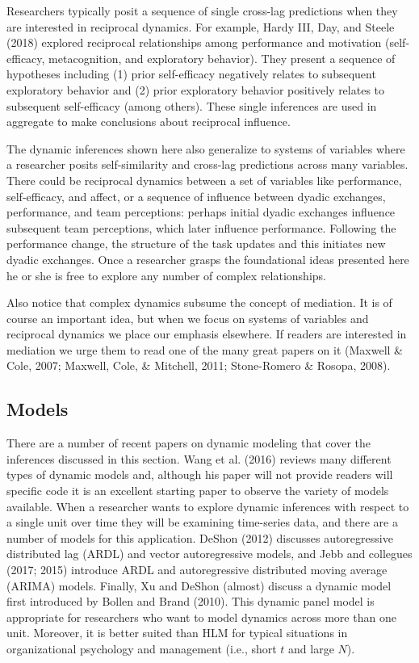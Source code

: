 \documentclass[english,,man]{apa6}
\theoremstyle{definition}
\theoremstyle{definition}
\theoremstyle{definition}
\theoremstyle{remark}
\begin{document}
Researchers typically posit a sequence of single cross-lag predictions
when they are interested in reciprocal dynamics. For example, Hardy III,
Day, and Steele (2018) explored reciprocal relationships among
performance and motivation (self-efficacy, metacognition, and
exploratory behavior). They present a sequence of hypotheses including
(1) prior self-efficacy negatively relates to subsequent exploratory
behavior and (2) prior exploratory behavior positively relates to
subsequent self-efficacy (among others). These single inferences are
used in aggregate to make conclusions about reciprocal influence.

The dynamic inferences shown here also generalize to systems of
variables where a researcher posits self-similarity and cross-lag
predictions across many variables. There could be reciprocal dynamics
between a set of variables like performance, self-efficacy, and affect,
or a sequence of influence between dyadic exchanges, performance, and
team perceptions: perhaps initial dyadic exchanges influence subsequent
team perceptions, which later influence performance. Following the
performance change, the structure of the task updates and this initiates
new dyadic exchanges. Once a researcher grasps the foundational ideas
presented here he or she is free to explore any number of complex
relationships.

Also notice that complex dynamics subsume the concept of mediation. It
is of course an important idea, but when we focus on systems of
variables and reciprocal dynamics we place our emphasis elsewhere. If
readers are interested in mediation we urge them to read one of the many
great papers on it (Maxwell \& Cole, 2007; Maxwell, Cole, \& Mitchell,
2011; Stone-Romero \& Rosopa, 2008).

\hypertarget{models-2}{%
\subsection{Models}\label{models-2}}

There are a number of recent papers on dynamic modeling that cover the
inferences discussed in this section. Wang et al. (2016) reviews many
different types of dynamic models and, although his paper will not
provide readers will specific code it is an excellent starting paper to
observe the variety of models available. When a researcher wants to
explore dynamic inferences with respect to a single unit over time they
will be examining time-series data, and there are a number of models for
this application. DeShon (2012) discusses autoregressive distributed lag
(ARDL) and vector autoregressive models, and Jebb and collegues (2017;
2015) introduce ARDL and autoregressive distributed moving average
(ARIMA) models. Finally, Xu and DeShon (almost) discuss a dynamic model
first introduced by Bollen and Brand (2010). This dynamic panel model is
appropriate for researchers who want to model dynamics across more than
one unit. Moreover, it is better suited than HLM for typical situations
in organizational psychology and management (i.e., short \(t\) and large
\(N\)).
\end{document}
